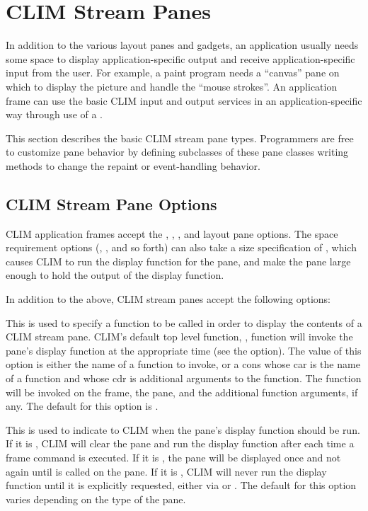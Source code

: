 \section {CLIM Stream Panes\label{clim-panes}}

In addition to the various layout panes and gadgets, an application usually
needs some space to display application-specific output and receive
application-specific input from the user.  For example, a paint program needs a
``canvas'' pane on which to display the picture and handle the ``mouse
strokes''.  An application frame can use the basic CLIM input and output
services in an application-specific way through use of a .

This section describes the basic CLIM stream pane types.  Programmers are
free to customize pane behavior by defining subclasses of these pane classes
writing methods to change the repaint or event-handling behavior.


\subsection {CLIM Stream Pane Options\label{clim-pane-options}}

CLIM application frames accept the , ,
, and layout pane options.  The space requirement options
(, , and so forth) can also take a size specification of
, which causes CLIM to run the display function for the pane, and
make the pane large enough to hold the output of the display function.

In addition to the above, CLIM stream panes accept the following options:


This is used to specify a function to be called in order to display the contents
of a CLIM stream pane.  CLIM's default top level function,
, function will invoke the pane's display function
at the appropriate time (see the  option).  The value of this
option is either the name of a function to invoke, or a cons whose car is the
name of a function and whose cdr is additional arguments to the function.  The
function will be invoked on the frame, the pane, and the additional function
arguments, if any.  The default for this option is .


This is used to indicate to CLIM when the pane's display function should be run.
If it is , CLIM will clear the pane and run the display
function after each time a frame command is executed.  If it is , the pane
will be displayed once and not again until  is
called on the pane.  If it is , CLIM will never run the display function
until it is explicitly requested, either via  or
.  The default for this option varies depending on the
type of the pane.

